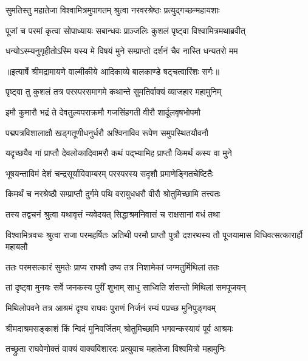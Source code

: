 \twolineshloka
{सुमतिस्तु महातेजा विश्वामित्रमुपागतम्}
{श्रुत्वा नरवरश्रेष्ठः प्रत्युद्गच्छन्महायशाः} %

\twolineshloka
{पूजां च परमां कृत्वा सोपाध्यायः सबान्धवः}
{प्राञ्जलिः कुशलं पृष्ट्वा विश्वामित्रमथाब्रवीत्} %

\twolineshloka
{धन्योऽस्म्यनुगृहीतोऽस्मि यस्य मे विषयं मुने}
{सम्प्राप्तो दर्शनं चैव नास्ति धन्यतरो मम} %


{॥इत्यार्षे श्रीमद्रामायणे वाल्मीकीये आदिकाव्ये बालकाण्डे षट्चत्वारिंशः सर्गः॥}


\twolineshloka
{पृष्ट्वा तु कुशलं तत्र परस्परसमागमे}
{कथान्ते सुमतिर्वाक्यं व्याजहार महामुनिम्} %

\twolineshloka
{इमौ कुमारौ भद्रं ते देवतुल्यपराक्रमौ}
{गजसिंहगती वीरौ शार्दूलवृषभोपमौ} %

\twolineshloka
{पद्मपत्रविशालाक्षौ खड्गतूणीधनुर्धरौ}
{अश्विनाविव रूपेण समुपस्थितयौवनौ} %

\twolineshloka
{यदृच्छयैव गां प्राप्तौ देवलोकादिवामरौ}
{कथं पद्भ्यामिह प्राप्तौ किमर्थं कस्य वा मुने} %

\twolineshloka
{भूषयन्ताविमं देशं चन्द्रसूर्याविवाम्बरम्}
{परस्परस्य सदृशौ प्रमाणेङ्गितचेष्टितैः} %

\twolineshloka
{किमर्थं च नरश्रेष्ठौ सम्प्राप्तौ दुर्गमे पथि}
{वरायुधधरौ वीरौ श्रोतुमिच्छामि तत्त्वतः} %

\twolineshloka
{तस्य तद्वचनं श्रुत्वा यथावृत्तं न्यवेदयत्}
{सिद्धाश्रमनिवासं च राक्षसानां वधं तथा} %

\threelineshloka
{विश्वामित्रवचः श्रुत्वा राजा परमहर्षितः}
{अतिथी परमौ प्राप्तौ पुत्रौ दशरथस्य तौ}
{पूजयामास विधिवत्सत्कारार्हौ महाबलौ} %

\twolineshloka
{ततः परमसत्कारं सुमतेः प्राप्य राघवौ}
{उष्य तत्र निशामेकां जग्मतुर्मिथिलां ततः} %

\twolineshloka
{तां दृष्ट्वा मुनयः सर्वे जनकस्य पुरीं शुभाम्}
{साधु साध्विति शंसन्तो मिथिलां समपूजयन्} %

\twolineshloka
{मिथिलोपवने तत्र आश्रमं दृश्य राघवः}
{पुराणं निर्जनं रम्यं पप्रच्छ मुनिपुङ्गवम्} %

\twolineshloka
{श्रीमदाश्रमसङ्काशं किं न्विदं मुनिवर्जितम्}
{श्रोतुमिच्छामि भगवन्कस्यायं पूर्व आश्रमः} %

\twolineshloka
{तच्छ्रुता राघवेणोक्तं वाक्यं वाक्यविशारदः}
{प्रत्युवाच महातेजा विश्वमित्रो महामुनिः} %


